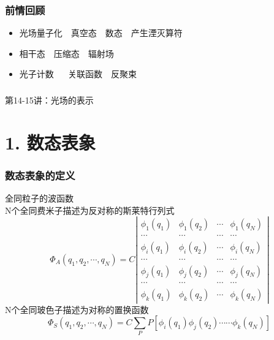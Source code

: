 \begin{frame}
    \frametitle{前情回顾}
    \begin{itemize}
        \item 光场量子化~~真空态~~数态~~产生湮灭算符 
        \item 相干态~~压缩态~~辐射场 
        \item 光子计数 ~~ 关联函数~~反聚束
    \end{itemize}     
\end{frame}

\begin{frame} [plain]
    \frametitle{}
    \Background[1] 
    \begin{center}
    {\huge 第14-15讲：光场的表示}
    \end{center}  
    \addtocounter{framenumber}{-1}   
\end{frame}

\section{1. 数态表象 }

\begin{frame} 
\frametitle{数态表象的定义}
{\Bullet}全同粒子的波函数 \\ 
   N个全同费米子描述为反对称的斯莱特行列式
   \[ \Phi_{A}\left(q_{1}, q_{2}, \cdots, q_{N}\right)=C\left|\begin{array}{cccc}
    \phi_{1}\left(q_{1}\right) & \phi_{1}\left(q_{2}\right) & \cdots & \phi_{1}\left(q_{N}\right) \\
    \cdots & \cdots & \cdots & \cdots \\
    \phi_{i}\left(q_{1}\right) & \phi_{i}\left(q_{2}\right) & \cdots & \phi_{i}\left(q_{N}\right) \\
    \cdots & \cdots & \cdots & \cdots \\
    \phi_{j}\left(q_{1}\right) & \phi_{j}\left(q_{2}\right) & \cdots & \phi_{j}\left(q_{N}\right) \\
    \cdots & \cdots & \cdots & \cdots \\
    \phi_{k}\left(q_{1}\right) & \phi_{k}\left(q_{2}\right) & \cdots & \phi_{k}\left(q_{N}\right)
    \end{array}\right|\]
    N个全同玻色子描述为对称的置换函数
    \[\Phi_{S}\left(q_{1}, q_{2}, \cdots, q_{N}\right)=C \sum_{P} P [\phi_{i}\left(q_{1}\right) \phi_{j}\left(q_{2}\right) \cdots \cdots \phi_{k}\left(q_{N}\right)] \]
\end{frame}

